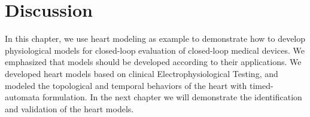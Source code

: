 



\section{Discussion}
In this chapter, we use heart modeling as example to demonstrate how to develop physiological models for closed-loop evaluation of closed-loop medical devices. We emphasized that models should be developed according to their applications. We developed heart models based on clinical Electrophysiological Testing, and modeled the topological and temporal behaviors of the heart with timed-automata formulation. In the next chapter we will demonstrate the identification and validation of the heart models.
 